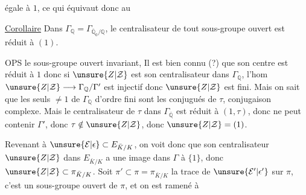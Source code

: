 égale à $1$, ce qui équivaut donc au

\uline{Corollaire} Dans $\Gamma_{\mathbb Q}=\Gamma_{\overline{\mathbb Q}_0/\mathbb Q}$, le centralisateur de tout sous-groupe ouvert est réduit à $(1)$.

OPS le sous-groupe ouvert  invariant, Il est bien connu (?) que son centre est réduit à $1$
donc si $\unsure{Z|\mathcal Z}$ est son centralisateur dans $\Gamma_{\mathbb Q}$, l'hom $\unsure{Z|\mathcal Z}\longrightarrow\Gamma_{\mathbb Q}/\Gamma'$ est injectif donc $\unsure{Z|\mathcal Z}$ est fini. Mais on sait que les seuls  $\neq1$ de $\Gamma_{\mathbb Q}$ d'ordre fini sont les conjugués de $\tau$, conjugaison complexe. Mais le centralisateur de $\tau$ dans $\Gamma_{\overline{\mathbb Q}}$ est réduit à $(1,\tau)$, donc ne peut contenir $\Gamma'$, donc $\tau\notin\unsure{Z|\mathcal Z}$, donc $\unsure{Z|\mathcal Z}=(1)$.

Revenant à $\unsure{\mathcal E|\epsilon}\subset E_{\bar K/K}$, on voit donc que son centralisateur $\unsure{Z|\mathcal Z}$ dans $E_{\bar K/K}$ a une image dans $\Gamma$  à $\{1\}$, donc $\unsure{Z|\mathcal Z}\subset\pi_{\bar K/K}$. Soit $\pi'\subset\pi=\pi_{\bar K/K}$ la trace de $\unsure{\mathcal E'|\epsilon'}$ sur $\pi$, c'est un sous-groupe ouvert de $\pi$, et on est ramené à
